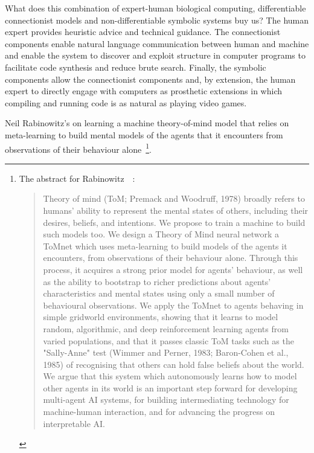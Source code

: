 What does this combination of expert-human biological computing, differentiable connectionist models and non-differentiable symbolic systems buy us? The human expert provides heuristic advice and technical guidance. The connectionist components enable natural language communication between human and machine and enable the system to discover and exploit structure in computer programs to facilitate code synthesis and reduce brute search. Finally, the symbolic components allow the connectionist components \emdash{} and, by extension, the human expert \emdash{} to directly engage with computers as prosthetic extensions in which compiling and running code is as natural as playing video games.



Neil Rabinowitz's {} on learning a machine theory-of-mind model that relies on meta-learning to build mental models of the agents that it encounters from observations of their behaviour alone~\cite{RabinowitzetalCoRR-18}\footnote{%
%
  The abstract for Rabinowitz~\etal{}~\cite{RabinowitzetalCoRR-18}:
%
  \begin{quotation}
%
    Theory of mind (ToM; Premack and Woodruff, 1978) broadly refers to humans' ability to represent the mental states of others, including their desires, beliefs, and intentions. We propose to train a machine to build such models too. We design a Theory of Mind neural network \emdash{} a ToMnet \emdash{} which uses meta-learning to build models of the agents it encounters, from observations of their behaviour alone. Through this process, it acquires a strong prior model for agents' behaviour, as well as the ability to bootstrap to richer predictions about agents' characteristics and mental states using only a small number of behavioural observations. We apply the ToMnet to agents behaving in simple gridworld environments, showing that it learns to model random, algorithmic, and deep reinforcement learning agents from varied populations, and that it passes classic ToM tasks such as the "Sally-Anne" test (Wimmer and Perner, 1983; Baron-Cohen et al., 1985) of recognising that others can hold false beliefs about the world. We argue that this system \emdash{} which autonomously learns how to model other agents in its world \emdash{} is an important step forward for developing multi-agent AI systems, for building intermediating technology for machine-human interaction, and for advancing the progress on interpretable AI.
%
\end{quotation}}.

